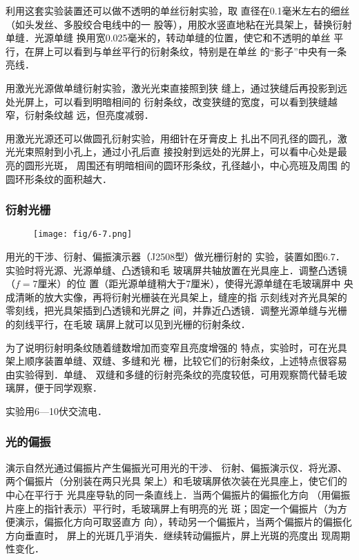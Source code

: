 利用这套实验装置还可以做不透明的单丝衍射实验，取
直径在0.1毫米左右的细丝（如头发丝、多股绞合电线中的一
股等），用胶水竖直地粘在光具架上，替换衍射单缝．光源单缝
换用宽0.025毫米的，转动单缝的位置，使它和不透明的单丝
平行，在屏上可以看到与单丝平行的衍射条纹，特别是在单丝
的“影子”中央有一条亮线．

用激光光源做单缝衍射实验，激光光束直接照到狭
缝上，通过狭缝后再投影到远处光屏上，可以看到明暗相间的
衍射条纹，改变狭缝的宽度，可以看到狭缝越窄，衍射条纹越
远，但亮度减弱．

用激光光源还可以做圆孔衍射实验，用细针在牙膏皮上
扎出不同孔径的圆孔，激光光束照射到小孔上，通过小孔后直
接投射到远处的光屏上，可以看中心处是最亮的圆形光斑，
周围还有明暗相间的圆环形条纹，孔径越小，中心亮班及周围
的圆环形条纹的面积越大．

\subsubsection{衍射光栅}
\begin{figure}[htp]
    \centering
    \texttt{[image: fig/6-7.png]}
    \caption{}
\end{figure}

用光的干涉、衍射、偏振演示器（J2508型）做光栅衍射的
实验，装置如图6.7．实验时将光源、光源单缝、凸透镜和毛
玻璃屏共轴放置在光具座上．调整凸透镜（$f=7$厘米）的位
置（距光源单缝稍大于7厘米），使得光源单缝在毛玻璃屏中
央成清晰的放大实像，再将衍射光栅装在光具架上，缝座的指
示刻线对齐光具架的零刻线，把光具架插到凸透镜和光屏之
间，并靠近凸透镜．调整光源单缝与光栅的刻线平行，在毛玻
璃屏上就可以见到光栅的衍射条纹．

为了说明衍射明条纹随着缝数增加而变窄且亮度增强的
特点，实验时，可在光具架上顺序装置单缝、双缝、多缝和光
栅，比较它们的衍射条纹，上述特点很容易由实验得到．单缝、
双缝和多缝的衍射亮条纹的亮度较低，可用观察筒代替毛玻
璃屏，便于同学观察．

实验用6—10伏交流电．

\subsubsection{光的偏振}

演示自然光通过偏振片产生偏振光可用光的干涉、
衍射、偏振演示仪．将光源、两个偏振片（分别装在两只光具
架上）和毛玻璃屏依次装在光具座上，使它们的中心在平行于
光具座导轨的同一条直线上．当两个偏振片的偏振化方向
（用偏振片座上的指针表示）平行时，毛玻璃屏上有明亮的光
斑；固定一个偏振片（为方便演示，偏振化方向可取竖直方
向），转动另一个偏振片，当两个偏振片的偏振化方向垂直时，
屏上的光斑几乎消失．继续转动偏振片，屏上光斑的亮度出
现周期性变化．

